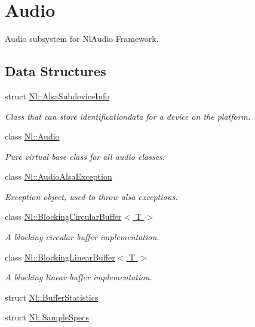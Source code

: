\hypertarget{group__Audio}{\section{Audio}
\label{group__Audio}
}


Audio subsystem for Nl\-Audio Framework.  


\subsection*{Data Structures}
\begin{DoxyCompactItemize}
\item 
struct \hyperlink{structNl_1_1AlsaSubdeviceInfo}{Nl\-::\-Alsa\-Subdevice\-Info}
\begin{DoxyCompactList}\small\item\em Class that can store identificationdata for a device on the platform. \end{DoxyCompactList}\item 
class \hyperlink{classNl_1_1Audio}{Nl\-::\-Audio}
\begin{DoxyCompactList}\small\item\em Pure virtual base class for all audio classes. \end{DoxyCompactList}\item 
class \hyperlink{classNl_1_1AudioAlsaException}{Nl\-::\-Audio\-Alsa\-Exception}
\begin{DoxyCompactList}\small\item\em Exception object, used to throw alsa exceptions. \end{DoxyCompactList}\item 
class \hyperlink{classNl_1_1BlockingCircularBuffer}{Nl\-::\-Blocking\-Circular\-Buffer$<$ T $>$}
\begin{DoxyCompactList}\small\item\em A blocking circular buffer implementation. \end{DoxyCompactList}\item 
class \hyperlink{classNl_1_1BlockingLinearBuffer}{Nl\-::\-Blocking\-Linear\-Buffer$<$ T $>$}
\begin{DoxyCompactList}\small\item\em A blocking linear buffer implementation. \end{DoxyCompactList}\item 
struct \hyperlink{structNl_1_1BufferStatistics}{Nl\-::\-Buffer\-Statistics}
\item 
struct \hyperlink{structNl_1_1SampleSpecs}{Nl\-::\-Sample\-Specs}
\end{DoxyCompactItemize}
